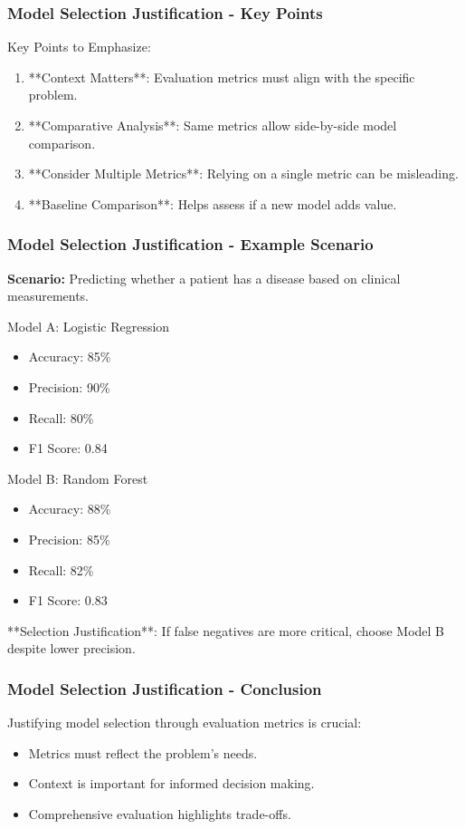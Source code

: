 \documentclass[aspectratio=169]{beamer}
\begin{document}
\begin{frame}[fragile]
    \frametitle{Model Selection Justification - Key Points}
    Key Points to Emphasize:
    \begin{enumerate}
        \item **Context Matters**: Evaluation metrics must align with the specific problem.
        \item **Comparative Analysis**: Same metrics allow side-by-side model comparison.
        \item **Consider Multiple Metrics**: Relying on a single metric can be misleading.
        \item **Baseline Comparison**: Helps assess if a new model adds value.
    \end{enumerate}
\end{frame}

\begin{frame}[fragile]
    \frametitle{Model Selection Justification - Example Scenario}
    \textbf{Scenario:} Predicting whether a patient has a disease based on clinical measurements.
    
    \begin{block}{Model A: Logistic Regression}
        \begin{itemize}
            \item Accuracy: 85\%
            \item Precision: 90\%
            \item Recall: 80\%
            \item F1 Score: 0.84
        \end{itemize}
    \end{block}
    
    \begin{block}{Model B: Random Forest}
        \begin{itemize}
            \item Accuracy: 88\%
            \item Precision: 85\%
            \item Recall: 82\%
            \item F1 Score: 0.83
        \end{itemize}
    \end{block}
    
    **Selection Justification**: If false negatives are more critical, choose Model B despite lower precision.
\end{frame}

\begin{frame}[fragile]
    \frametitle{Model Selection Justification - Conclusion}
    Justifying model selection through evaluation metrics is crucial:
    \begin{itemize}
        \item Metrics must reflect the problem's needs.
        \item Context is important for informed decision making.
        \item Comprehensive evaluation highlights trade-offs.
    \end{itemize}
\end{frame}
\end{document}
